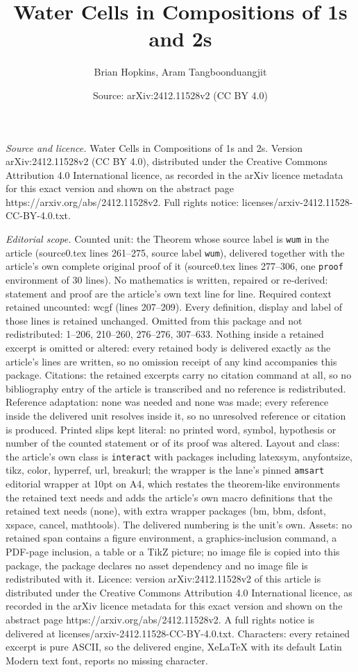 \documentclass[10pt,a4paper]{amsart}
\title[Water Cells in Compositions of 1s and 2s]{Water Cells in Compositions of 1s and 2s}
\author{Brian Hopkins, Aram Tangboonduangjit}
\date{Source: arXiv:2412.11528v2 (CC BY 4.0)}
\begin{document}
\maketitle

\noindent\emph{Source and licence.} Water Cells in Compositions of 1s and 2s. Version arXiv:2412.11528v2 (CC BY 4.0), distributed under the Creative Commons Attribution 4.0 International licence, as recorded in the arXiv licence metadata for this exact version and shown on the abstract page https://arxiv.org/abs/2412.11528v2. Full rights notice: licenses/arxiv-2412.11528-CC-BY-4.0.txt.\par\smallskip

\noindent\textit{Editorial scope.} Counted unit: the Theorem whose source label is \texttt{wum} in the article (source0.tex lines 261--275, source label \texttt{wum}), delivered together with the article's own complete original proof of it (source0.tex lines 277--306, one \texttt{proof} environment of 30 lines). No mathematics is written, repaired or re-derived: statement and proof are the article's own text line for line. Required context retained uncounted: wcgf (lines 207--209). Every definition, display and label of those lines is retained unchanged. Omitted from this package and not redistributed: 1--206, 210--260, 276--276, 307--633. Nothing inside a retained excerpt is omitted or altered: every retained body is delivered exactly as the article's lines are written, so no omission receipt of any kind accompanies this package. Citations: the retained excerpts carry no citation command at all, so no bibliography entry of the article is transcribed and no reference is redistributed. Reference adaptation: none was needed and none was made; every reference inside the delivered unit resolves inside it, so no unresolved reference or citation is produced. Printed slips kept literal: no printed word, symbol, hypothesis or number of the counted statement or of its proof was altered. Layout and class: the article's own class is \texttt{interact} with packages including latexsym, anyfontsize, tikz, color, hyperref, url, breakurl; the wrapper is the lane's pinned \texttt{amsart} editorial wrapper at 10pt on A4, which restates the theorem-like environments the retained text needs and adds the article's own macro definitions that the retained text needs (none), with extra wrapper packages (bm, bbm, dsfont, xspace, cancel, mathtools). The delivered numbering is the unit's own. Assets: no retained span contains a figure environment, a graphics-inclusion command, a PDF-page inclusion, a table or a TikZ picture; no image file is copied into this package, the package declares no asset dependency and no image file is redistributed with it. Licence: version arXiv:2412.11528v2 of this article is distributed under the Creative Commons Attribution 4.0 International licence, as recorded in the arXiv licence metadata for this exact version and shown on the abstract page https://arxiv.org/abs/2412.11528v2. A full rights notice is delivered at licenses/arxiv-2412.11528-CC-BY-4.0.txt. Characters: every retained excerpt is pure ASCII, so the delivered engine, XeLaTeX with its default Latin Modern text font, reports no missing character.
\end{document}

